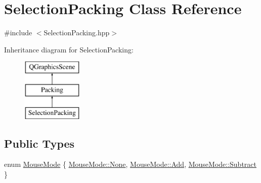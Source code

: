 \hypertarget{class_selection_packing}{}\section{Selection\+Packing Class Reference}
\label{class_selection_packing}


{\ttfamily \#include $<$Selection\+Packing.\+hpp$>$}

Inheritance diagram for Selection\+Packing\+:\begin{figure}[H]
\begin{center}
\leavevmode
\includegraphics[height=3.000000cm]{class_selection_packing}
\end{center}
\end{figure}
\subsection*{Public Types}
\begin{DoxyCompactItemize}
\item 
enum \hyperlink{class_selection_packing_a34fc2fbb6a758004b3b19d7c73997241}{Mouse\+Mode} \{ \hyperlink{class_selection_packing_a34fc2fbb6a758004b3b19d7c73997241a6adf97f83acf6453d4a6a4b1070f3754}{Mouse\+Mode\+::\+None}, 
\hyperlink{class_selection_packing_a34fc2fbb6a758004b3b19d7c73997241aec211f7c20af43e742bf2570c3cb84f9}{Mouse\+Mode\+::\+Add}, 
\hyperlink{class_selection_packing_a34fc2fbb6a758004b3b19d7c73997241a1d9baf077ee87921f57a8fe42d510b65}{Mouse\+Mode\+::\+Subtract}
 \}
\end{DoxyCompactItemize}
